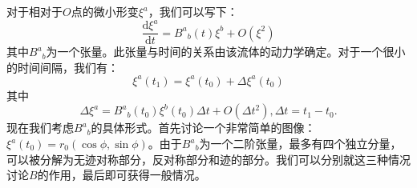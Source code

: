 \documentclass[hyperref, UTF8, a4paper]{ctexart}
\begin{document}
对于相对于$O$点的微小形变$\xi ^{a}$，我们可以写下：
\begin{equation*}
	\frac{\mathrm{d} \xi ^{a}}{\mathrm{d} t} =B^{a}{}_{b}( t) \xi ^{b} +O \left( \xi ^{2}\right)
\end{equation*}
其中$B^{a}{}_{b}$为一个张量。此张量与时间的关系由该流体的动力学确定。对于一个很小的时间间隔，我们有：
\begin{equation*}
	\xi ^{a}( t_{1}) =\xi ^{a}( t_{0}) +\Delta \xi ^{a}( t_{0})
\end{equation*}
其中
\begin{equation*}
	\Delta \xi ^{a} =B^{a}{}_{b}( t_{0}) \xi ^{b}( t_{0}) \Delta t+O \left( \Delta t^{2}\right) ,\Delta t=t_{1} -t_{0} .
\end{equation*}
现在我们考虑$B^{a}{}_{b}$的具体形式。首先讨论一个非常简单的图像：$\xi ^{a}( t_{0}) =r_{0}(\cos \phi ,\sin \phi )$。由于$B^{a}{}_{b}$为一个二阶张量，最多有四个独立分量，可以被分解为无迹对称部分，反对称部分和迹的部分。我们可以分别就这三种情况讨论$B$的作用，最后即可获得一般情况。
\end{document}
